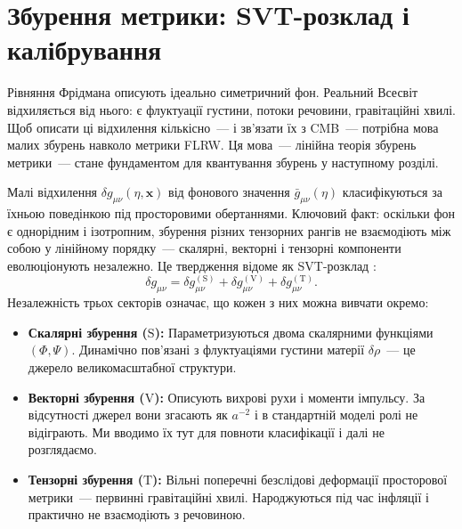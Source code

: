 \documentclass[12pt, a4paper]{article}
\begin{document}
\section{Збурення метрики: SVT-розклад і калібрування}
\label{sec:metric}

Рівняння Фрідмана описують ідеально симетричний фон.
Реальний Всесвіт відхиляється від нього: є флуктуації густини,
потоки речовини, гравітаційні хвилі. Щоб описати ці відхилення
кількісно~--- і зв'язати їх з CMB~--- потрібна мова малих збурень
навколо метрики FLRW. Ця мова~--- лінійна теорія збурень метрики~---
стане фундаментом для квантування збурень у наступному розділі.

Малі відхилення $\delta g_{\mu\nu}(\eta, \mathbf{x})$ від
фонового значення $\bar{g}_{\mu\nu}(\eta)$ класифікуються за
їхньою поведінкою під просторовими обертаннями. Ключовий факт:
оскільки фон є однорідним і ізотропним, збурення різних
тензорних рангів не взаємодіють між собою у лінійному порядку~---
скалярні, векторні і тензорні компоненти еволюціонують
незалежно. Це твердження відоме як SVT-розклад
\cite{stewart_walker_1974}:
\begin{equation}\label{eq:svt_decomposition}
  \delta g_{\mu\nu}
    = \delta g_{\mu\nu}^{(\mathrm{S})}
    + \delta g_{\mu\nu}^{(\mathrm{V})}
    + \delta g_{\mu\nu}^{(\mathrm{T})}.
\end{equation}
Незалежність трьох секторів означає, що кожен з них можна
вивчати окремо:
\begin{itemize}
  \item \textbf{Скалярні збурення ($\mathrm{S}$):}
        Параметризуються двома скалярними функціями
        $(\Phi, \Psi)$. Динамічно пов'язані з флуктуаціями
        густини матерії $\delta\rho$~--- це джерело
        великомасштабної структури.
  \item \textbf{Векторні збурення ($\mathrm{V}$):}
        Описують вихрові рухи і моменти імпульсу. За
        відсутності джерел вони згасають як $a^{-2}$
        \cite{mukhanov_2005} і в стандартній моделі ролі не
        відіграють. Ми вводимо їх тут для повноти
        класифікації і далі не розглядаємо.
  \item \textbf{Тензорні збурення ($\mathrm{T}$):}
        Вільні поперечні безслідові деформації просторової
        метрики~--- первинні гравітаційні хвилі. Народжуються
        під час інфляції і практично не взаємодіють з
        речовиною.
\end{itemize}
\end{document}

